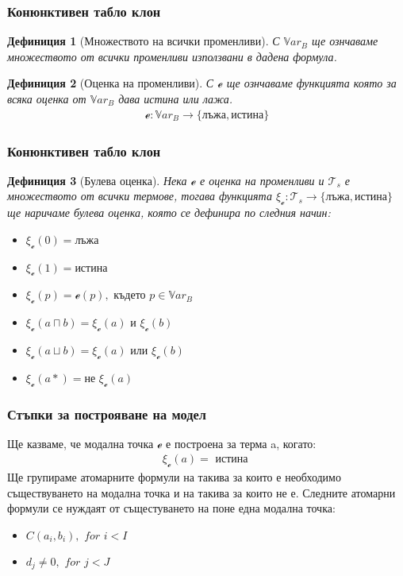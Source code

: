 \documentclass{beamer}
\newtheorem{defn}{Дефиниция}[section]
\newcommand{\curvedE}{\mathscr{e}}
\newcommand{\Var}{\mathbb{V}ar}
\newcommand{\vBool}{\xi}
\newcommand{\Ts}{\mathcal{T}_s}
\begin{document}
\begin{frame}\frametitle{Конюнктивен табло клон}
\begin{defn}[Множеството на всички променливи]
	С $\Var_B$ ще ознчаваме множеството от всички променливи използвани в дадена формула.
\end{defn}

\begin{defn}[Оценка на променливи]
	С $\curvedE$ ще ознчаваме функцията която за всяка оценка от $\Var_B$ дава истина или лажа.
		\begin{align*}
			\curvedE : \Var_B \rightarrow \{ \textbf{лъжа}, \textbf{истина}\}
		\end{align*}
\end{defn}
\end{frame}

\begin{frame}\frametitle{Конюнктивен табло клон}
\begin{defn}[Булева оценка]
		Нека $\curvedE$ е оценка на променливи и $\Ts$ е множеството от всички термове, тогава 
		функцията $\vBool_{\curvedE} : \Ts \rightarrow \{ \textbf{лъжа}, \textbf{истина}\}$ ще наричаме булева оценка, която се дефинира по следния начин:
		\begin{itemize}
			\item $\vBool_{\curvedE}(0) = \textbf{лъжа}$
			\item $\vBool_{\curvedE}(1) = \textbf{истина}$
			\item $\vBool_{\curvedE}(p) = \curvedE(p), \textit{ където } p \in \Var_B$
			\item $\vBool_{\curvedE}(a \sqcap b) = \vBool_{\curvedE}(a) \textit{ и } \vBool_{\curvedE}(b)$
			\item $\vBool_{\curvedE}(a \sqcup b) = \vBool_{\curvedE}(a) \textit{ или } \vBool_{\curvedE}(b)$
			\item $\vBool_{\curvedE}(a*) = \textit{не } \vBool_{\curvedE}(a)$
		\end{itemize}
\end{defn}
\end{frame}

\begin{frame}\frametitle{Стъпки за построяване на модел}
	Ще казваме, че модална точка $\curvedE$ е построена за терма a, когато:
		\begin{align*}
			\vBool_{\curvedE}(a) = \textit{ истина }
		\end{align*}
	Ще групираме атомарните формули на такива за които е необходимо съществуването на модална точка и на такива за които не е.
\newline
	Следните атомарни формули се нуждаят от същестуването на поне една модална точка:
		\begin{itemize}
			\item $C(a_i, b_i), \textit{ for } i < I$
			\item $d_j \neq 0, \textit{ for } j < J$
		\end{itemize}
\end{frame}
\end{document}
